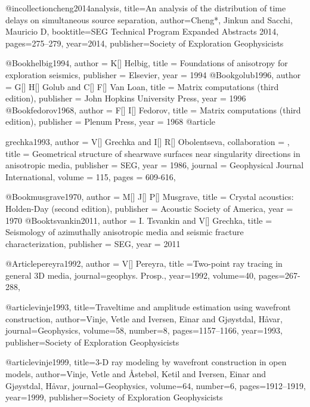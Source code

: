 @incollection{cheng2014analysis,
  title={An analysis of the distribution of time delays on simultaneous source separation},
  author={Cheng*, Jinkun and Sacchi, Mauricio D},
  booktitle={SEG Technical Program Expanded Abstracts 2014},
  pages={275--279},
  year={2014},
  publisher={Society of Exploration Geophysicists}
}

@Book{helbig1994,
  author =	 {K[] Helbig},
  title =	 {Foundations of anisotropy for exploration seismics},
  publisher =	 {Elsevier},
  year =	 1994
}
@Book{golub1996,
  author =	 {G[] H[] Golub and C[] F[] Van Loan},
  title =	 {Matrix computations (third edition)},
  publisher =	 {John Hopkins University Press},
  year =	 1996
}
@Book{fedorov1968,
  author =	 {F[] I[] Fedorov},
  title =	 {Matrix computations (third edition)},
  publisher =	 {Plenum Press},
  year =	 1968
}
@article{grechka1993,
author = {V[] Grechka and I[] R[] Obolentseva},
collaboration = {},
title = {Geometrical structure of shearwave
surfaces near singularity directions in anisotropic media},
publisher = {SEG},
year = {1986},
journal = {Geophysical Journal International},
volume = {115},
pages = {609-616},

}

@Book{musgrave1970,
  author =	 {M[] J[] P[] Musgrave},
  title =	 {Crystal acoustics: Holden-Day (second edition)},
  publisher =	 {Acoustic Society of America},
  year =	 1970
}
@Book{tsvankin2011,
  author =	 {I. Tsvankin and V[] Grechka},
  title =	 {Seismology of azimuthally anisotropic media and seismic fracture characterization},
  publisher =	 {SEG},
  year =	 2011
}

@Article{pereyra1992,
  author = {V[] Pereyra},
  title ={Two-point ray tracing in general 3{D} media},
  journal={geophys. Prosp.},
  year=1992,
  volume=40,
  pages={267-288},
}


@article{vinje1993,
  title={Traveltime and amplitude estimation using wavefront construction},
  author={Vinje, Vetle and Iversen, Einar and Gj{\o}ystdal, H{\aa}var},
  journal={Geophysics},
  volume={58},
  number={8},
  pages={1157--1166},
  year={1993},
  publisher={Society of Exploration Geophysicists}
}

@article{vinje1999,
  title={3-D ray modeling by wavefront construction in open models},
  author={Vinje, Vetle and {\AA}steb{\o}l, Ketil and Iversen, Einar and Gj{\o}ystdal, H{\aa}var},
  journal={Geophysics},
  volume={64},
  number={6},
  pages={1912--1919},
  year={1999},
  publisher={Society of Exploration Geophysicists}
}

